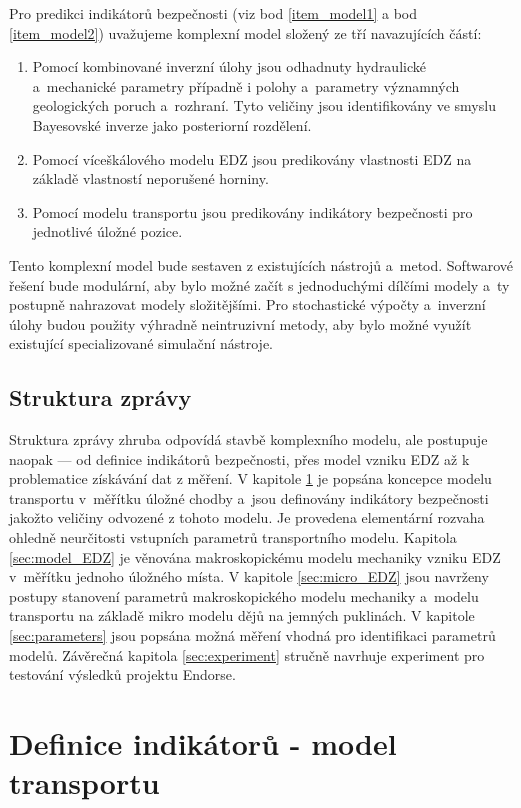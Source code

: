 \documentclass{article}
\begin{document}
Pro predikci indikátorů bezpečnosti (viz bod \ref{item_model1} 
a bod \ref{item_model2}) uvažujeme komplexní model složený ze tří navazujících částí: 
    \begin{enumerate}
    \item Pomocí kombinované inverzní úlohy jsou odhadnuty hydraulické a~mechanické
     parametry  případně i polohy a~parametry významných geologických poruch a~rozhraní. 
     Tyto veličiny jsou identifikovány ve smyslu Bayesovské inverze jako posteriorní rozdělení.
    \item Pomocí víceškálového modelu EDZ jsou predikovány vlastnosti EDZ na základě vlastností neporušené horniny.
    \item Pomocí modelu transportu jsou predikovány indikátory bezpečnosti pro jednotlivé úložné pozice.
    \end{enumerate}

Tento komplexní model bude sestaven z existujících nástrojů a~metod. Softwarové řešení bude modulární, aby bylo možné začít s
jednoduchými dílčími modely a~ty postupně nahrazovat modely složitějšími. Pro stochastické výpočty a~inverzní úlohy budou 
použity výhradně neintruzivní metody, aby bylo možné využít existující specializované simulační nástroje.

    
\subsection{Struktura zprávy}
Struktura zprávy zhruba odpovídá stavbě komplexního modelu, ale postupuje naopak --- od definice indikátorů bezpečnosti,
přes model vzniku EDZ až k problematice získávání dat z měření. 
V kapitole \ref{sec:transport} je popsána koncepce modelu transportu v~měřítku úložné chodby a~jsou
definovány indikátory bezpečnosti jakožto veličiny odvozené z tohoto modelu. Je provedena elementární rozvaha ohledně 
neurčitosti vstupních parametrů transportního modelu. Kapitola
\ref{sec:model_EDZ} je věnována makroskopickému modelu mechaniky vzniku EDZ v~měřítku jednoho úložného místa. 
V kapitole \ref{sec:micro_EDZ} jsou navrženy postupy stanovení parametrů makroskopického modelu mechaniky a~modelu transportu 
na základě mikro modelu dějů na jemných puklinách.
V kapitole \ref{sec:parameters} jsou popsána možná měření vhodná pro identifikaci 
parametrů modelů. Závěrečná kapitola \ref{sec:experiment} stručně navrhuje experiment pro testování výsledků projektu Endorse.


\section{Definice indikátorů - model transportu}
\label{sec:transport}
\end{document}
